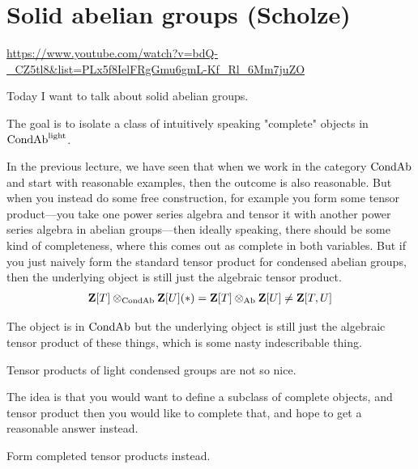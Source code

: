 
\section{\ufs Solid abelian groups (Scholze)}

\url{https://www.youtube.com/watch?v=bdQ-_CZ5tl8&list=PLx5f8IelFRgGmu6gmL-Kf_Rl_6Mm7juZO}
\renewcommand{\yt}[2]{\href{https://www.youtube.com/watch?v=bdQ-_CZ5tl8&list=PLx5f8IelFRgGmu6gmL-Kf_Rl_6Mm7juZO&t=#1}{#2}}
\vspace{1em}

Today I want to talk about solid abelian groups. 

\begin{goal}

The goal is to isolate a class of intuitively speaking "complete" objects in $\mathrm{Cond}\mathrm{Ab}^{\mathrm{light}}$. 

\end{goal}

In the previous lecture, we have seen that when we work in the category $\mathrm{Cond}\mathrm{Ab}$ and start with reasonable examples, then the outcome is also reasonable. 
But when you instead do some free construction, for example you form some tensor product---you take one power series algebra and tensor it with another power series algebra in abelian groups---then ideally speaking, there should be some kind of completeness, where this comes out as complete in both variables. 
But if you just naively form the standard tensor product for condensed abelian groups, then the underlying object is still just the algebraic tensor product.
\begin{align*}
\mathbf Z[T] \otimes_{\mathrm{Cond}\mathrm{Ab}} \mathbf Z[U](\ast) = \mathbf Z[T] \otimes_{\mathrm{Ab}} \mathbf Z[U] \neq \mathbf Z[T,U]
\end{align*}

The object is in $\mathrm{Cond}\mathrm{Ab}$ but the underlying object is still just the algebraic tensor product of these things, which is some nasty indescribable thing. 

Tensor products of light condensed groups are not so nice.

The idea is that you would want to define a subclass of complete objects, and tensor product then you would like to complete that, and hope to get a reasonable answer instead. 

\begin{idea}
Form completed tensor products instead.
\end{idea}

